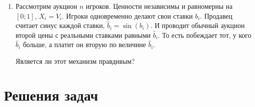 \begin{enumerate}
\item Рассмотрим аукцион $ n $ игроков. Ценности независимы и равномерны на $ [0;1] $, $ X_{i}=V_{i} $. Игроки одновременно делают свои ставки $ b_{i} $. Продавец считает синус каждой ставки, $ \hat{b}_{i}=\sin (b_{i}) $. И проводит обычный аукцион второй цены с реальными ставками равными $\hat{b}_{i}  $. То есть побеждает тот, у кого $ \hat{b}_{i} $ больше, а платит он вторую по величине $ \hat{b}_{i} $.

Является ли этот механизм правдивым?




\end{enumerate}








\section{Решения задач}
